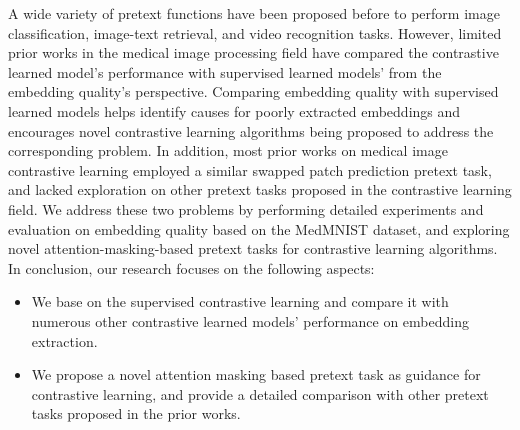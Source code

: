 \documentclass[12pt,twoside]{report}
\begin{document}
A wide variety of pretext functions have been proposed before to perform image classification, image-text retrieval, and video recognition tasks. However, limited prior works in the medical image processing field have compared the contrastive learned model's performance with supervised learned models' from the embedding quality's perspective. Comparing embedding quality with supervised learned models helps identify causes for poorly extracted embeddings and encourages novel contrastive learning algorithms being proposed to address the corresponding problem. In addition, most prior works on medical image contrastive learning employed a similar swapped patch prediction pretext task, and lacked exploration on other pretext tasks proposed in the contrastive learning field. We address these two problems by performing detailed experiments and evaluation on embedding quality based on the MedMNIST dataset, and exploring novel attention-masking-based pretext tasks for contrastive learning algorithms. \\



In conclusion, our research focuses on the following aspects: 
\begin{itemize}
    \item We base on the supervised contrastive learning\cite{supervisedContrastLearning} and compare it with numerous other contrastive learned models' performance on embedding extraction.
    \item We propose a novel attention masking based pretext task as guidance for contrastive learning, and provide a detailed comparison with other pretext tasks proposed in the prior works. 
\end{itemize}

\end{document}
